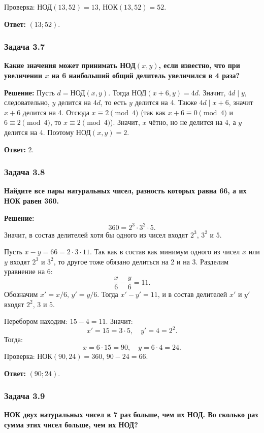 \documentclass[12pt, a4paper]{article}
\begin{document}
Проверка: $\text{НОД}(13, 52) = 13$, $\text{НОК}(13, 52) = 52$.

\textbf{Ответ:} $(13; 52)$.

\subsubsection*{Задача 3.7}
\textbf{Какие значения может принимать НОД$(x, y)$, если известно, что при увеличении $x$ на 6 наибольший общий делитель увеличился в 4 раза?}

\textbf{Решение:}
Пусть $d = \text{НОД}(x, y)$. Тогда $\text{НОД}(x+6, y) = 4d$. Значит, $4d \mid y$, следовательно, $y$ делится на $4d$, то есть $y$ делится на 4. Также $4d \mid x+6$, значит $x+6$ делится на 4. Отсюда $x \equiv 2 \pmod{4}$ (так как $x+6 \equiv 0 \pmod{4}$ и $6 \equiv 2 \pmod{4}$, то $x \equiv 2 \pmod{4}$). Значит, $x$ чётно, но не делится на 4, а $y$ делится на 4. Поэтому $\text{НОД}(x, y) = 2$.

\textbf{Ответ:} 2.

\subsubsection*{Задача 3.8}
\textbf{Найдите все пары натуральных чисел, разность которых равна 66, а их НОК равен 360.}

\textbf{Решение:}
\[
360 = 2^3 \cdot 3^2 \cdot 5.
\]
Значит, в состав делителей хотя бы одного из чисел входят $2^3$, $3^2$ и $5$.

Пусть $x - y = 66 = 2 \cdot 3 \cdot 11$. Так как в состав как минимум одного из чисел $x$ или $y$ входят $2^3$ и $3^2$, то другое тоже обязано делиться на 2 и на 3. Разделим уравнение на $6$:
\[
\frac{x}{6} - \frac{y}{6} = 11.
\]
Обозначим $x' = x/6$, $y' = y/6$. Тогда $x' - y' = 11$, и в состав делителей $x'$ и $y'$ входят $2^2$, $3$ и $5$.

Перебором находим: $15 - 4 = 11$. Значит:
\[
x' = 15 = 3 \cdot 5, \quad y' = 4 = 2^2.
\]
Тогда:
\[
x = 6 \cdot 15 = 90, \quad y = 6 \cdot 4 = 24.
\]
Проверка: $\text{НОК}(90, 24) = 360$, $90 - 24 = 66$.

\textbf{Ответ:} $(90; 24)$.

\subsubsection*{Задача 3.9}
\textbf{НОК двух натуральных чисел в 7 раз больше, чем их НОД. Во сколько раз сумма этих чисел больше, чем их НОД?}
\end{document}
